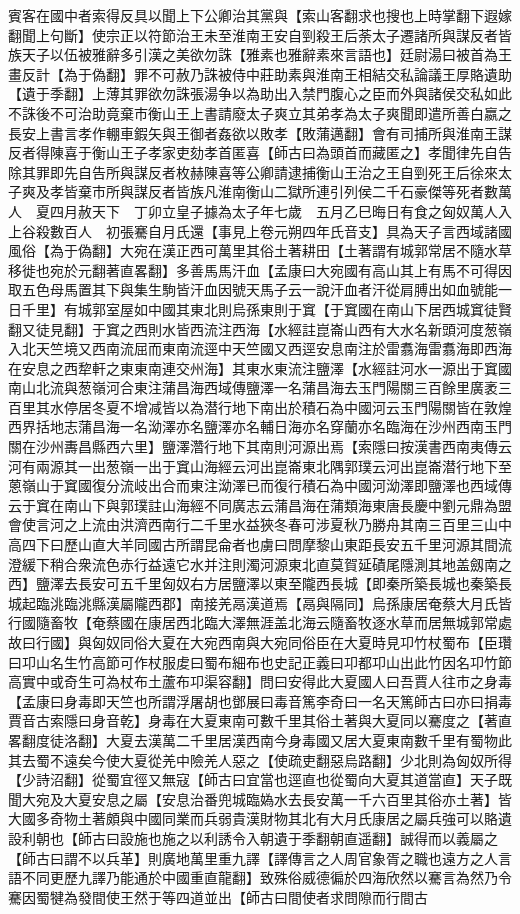 賓客在國中者索得反具以聞上下公卿治其黨與【索山客翻求也搜也上時掌翻下遐嫁翻聞上句斷】使宗正以符節治王未至淮南王安自剄殺王后荼太子遷諸所與謀反者皆族天子以伍被雅辭多引漢之美欲勿誅【雅素也雅辭素來言語也】廷尉湯曰被首為王畫反計【為于偽翻】罪不可赦乃誅被侍中莊助素與淮南王相結交私論議王厚賂遺助【遺于季翻】上薄其罪欲勿誅張湯争以為助出入禁門腹心之臣而外與諸侯交私如此不誅後不可治助竟棄市衡山王上書請廢太子爽立其弟孝為太子爽聞即遣所善白嬴之長安上書言孝作輣車鍜矢與王御者姦欲以敗孝【敗蒲邁翻】會有司捕所與淮南王謀反者得陳喜于衡山王子孝家吏劾孝首匿喜【師古曰為頭首而藏匿之】孝聞律先自告除其罪即先自告所與謀反者枚赫陳喜等公卿請逮捕衡山王治之王自剄死王后徐來太子爽及孝皆棄市所與謀反者皆族凡淮南衡山二獄所連引列侯二千石豪傑等死者數萬人　夏四月赦天下　丁卯立皇子據為太子年七歲　五月乙巳晦日有食之匈奴萬人入上谷殺數百人　初張騫自月氏還【事見上卷元朔四年氏音支】具為天子言西域諸國風俗【為于偽翻】大宛在漢正西可萬里其俗土著耕田【土著謂有城郭常居不隨水草移徙也宛於元翻著直畧翻】多善馬馬汗血【孟康曰大宛國有高山其上有馬不可得因取五色母馬置其下與集生駒皆汗血因號天馬子云一說汗血者汗從肩膊出如血號能一日千里】有城郭室屋如中國其東北則烏孫東則于窴【于窴國在南山下居西城窴徒賢翻又徒見翻】于窴之西則水皆西流注西海【水經註崑崙山西有大水名新頭河度葱嶺入北天竺境又西南流屈而東南流逕中天竺國又西逕安息南注於雷翥海雷翥海即西海在安息之西犂軒之東東南連交州海】其東水東流注鹽澤【水經註河水一源出于窴國南山北流與葱嶺河合東注蒲昌海西域傳鹽澤一名蒲昌海去玉門陽關三百餘里廣袤三百里其水停居冬夏不增减皆以為潜行地下南出於積石為中國河云玉門陽關皆在敦煌西界括地志蒲昌海一名泑澤亦名鹽澤亦名輔日海亦名穿蘭亦名臨海在沙州西南玉門關在沙州夀昌縣西六里】鹽澤濳行地下其南則河源出焉【索隱曰按漢書西南夷傳云河有兩源其一出葱嶺一出于窴山海經云河出崑崙東北隅郭璞云河出崑崙潜行地下至蒽嶺山于窴國復分流岐出合而東注泑澤已而復行積石為中國河泑澤即鹽澤也西域傳云于窴在南山下與郭璞註山海經不同廣志云蒲昌海在蒲類海東唐長慶中劉元鼎為盟會使言河之上流由洪濟西南行二千里水益狹冬春可涉夏秋乃勝舟其南三百里三山中高四下曰歷山直大羊同國古所謂昆侖者也虜曰問摩黎山東距長安五千里河源其間流澄緩下稍合衆流色赤行益遠它水并注則濁河源東北直莫賀延磧尾隱測其地盖劔南之西】鹽澤去長安可五千里匈奴右方居鹽澤以東至隴西長城【即秦所築長城也秦築長城起臨洮臨洮縣漢屬隴西郡】南接羌鬲漢道焉【鬲與隔同】烏孫康居奄蔡大月氏皆行國隨畜牧【奄蔡國在康居西北臨大澤無涯盖北海云隨畜牧逐水草而居無城郭常處故曰行國】與匈奴同俗大夏在大宛西南與大宛同俗臣在大夏時見卭竹杖蜀布【臣瓚曰卭山名生竹高節可作杖服䖍曰蜀布細布也史記正義曰卭都卭山出此竹因名卭竹節高實中或奇生可為杖布土蘆布卭渠容翻】問曰安得此大夏國人曰吾賈人往市之身毒【孟康曰身毒即天竺也所謂浮屠胡也鄧展曰毒音篤李奇曰一名天篤師古曰亦曰捐毒賈音古索隱曰身音乾】身毒在大夏東南可數千里其俗土著與大夏同以騫度之【著直畧翻度徒洛翻】大夏去漢萬二千里居漢西南今身毒國又居大夏東南數千里有蜀物此其去蜀不遠矣今使大夏從羌中險羌人惡之【使疏吏翻惡烏路翻】少北則為匈奴所得【少詩沼翻】從蜀宜徑又無寇【師古曰宜當也逕直也從蜀向大夏其道當直】天子既聞大宛及大夏安息之屬【安息治番兜城臨媯水去長安萬一千六百里其俗亦土著】皆大國多奇物土著頗與中國同業而兵弱貴漢財物其北有大月氏康居之屬兵強可以賂遺設利朝也【師古曰設施也施之以利誘令入朝遺于季翻朝直遥翻】誠得而以義屬之【師古曰謂不以兵革】則廣地萬里重九譯【譯傳言之人周官象胥之職也遠方之人言語不同更歷九譯乃能通於中國重直龍翻】致殊俗威德徧於四海欣然以騫言為然乃令騫因蜀犍為發間使王然于等四道並出【師古曰間使者求問隙而行間古